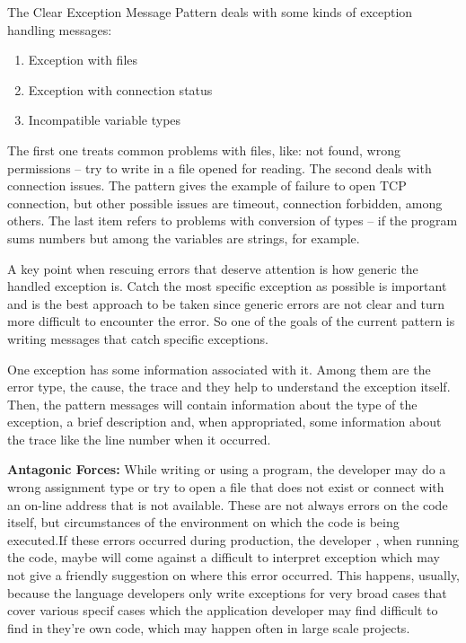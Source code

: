 \documentclass[12pt]{article}
\begin{document}
\begin{flushleft}
\newpage
The Clear Exception Message Pattern deals with some kinds of exception handling messages:
 \begin{enumerate}
 \item Exception with files
 \item Exception with connection status
 \item Incompatible variable types 
  \end{enumerate} 
 
The first one treats common problems with files, like: not found, wrong permissions -- try to write in a file opened for reading. The second deals with connection issues. The pattern gives the example of failure to open TCP connection, but other possible issues are timeout, connection forbidden, among others. The last item refers to problems with conversion of types -- if the program sums numbers but among the variables are strings, for example.

A key point when rescuing errors that deserve attention is how generic the handled exception is. Catch the most specific exception as possible is important and is the best approach to be taken since generic errors are not clear and turn more difficult to encounter the error. So one of the goals of the current pattern is writing messages that catch specific exceptions. 
 
One exception has some information associated with it. Among them are the error type, the cause, the trace and they help to understand the exception itself. Then, the pattern messages will contain information about the type of the exception, a brief description and, when appropriated, some information about the trace like the line number when it occurred.


\textbf{Antagonic Forces:} While writing or using a program, the developer may do a wrong assignment type or try to open a file that does not exist or connect with an on-line address that is not available. These are not always errors on the code itself, but circumstances of the environment on which the code is being executed.If these errors occurred during production, the developer , when running the code, maybe will come against a difficult to interpret exception which may not give a friendly suggestion on where this error occurred. This happens, usually, because the language developers only write exceptions for very broad cases that cover various specif cases which the application developer may find difficult to find in they're own code, which may happen often in large scale projects.  \newline


\end{flushleft}
\end{document}
